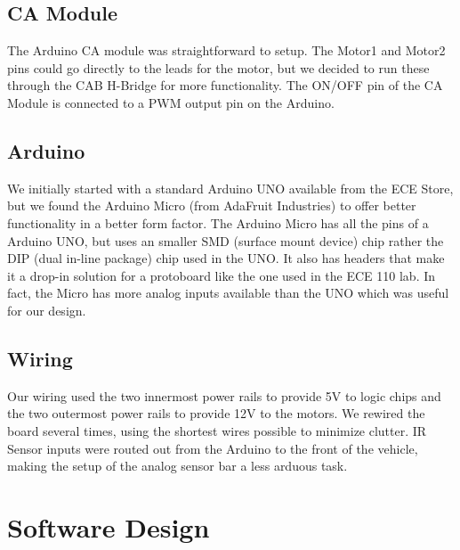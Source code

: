 \documentclass{article}
\begin{document}
\subsection{CA Module}
The Arduino CA module was straightforward to setup. The Motor1 and Motor2 pins could go directly to the leads for the motor, but we decided to run these through the CAB H-Bridge for more functionality. The ON/OFF pin of the CA Module is connected to a PWM output pin on the Arduino.
\subsection{Arduino}
We initially started with a standard Arduino UNO available from the ECE Store, but we found the Arduino Micro (from AdaFruit Industries) to offer better functionality in a better form factor. The Arduino Micro has all the pins of a Arduino UNO, but uses an smaller SMD (surface mount device) chip rather the DIP (dual in-line package) chip used in the UNO. It also has headers that make it a drop-in solution for a protoboard like the one used in the ECE 110 lab. In fact, the Micro has more analog inputs available than the UNO which was useful for our design.
\subsection{Wiring}
Our wiring used the two innermost power rails to provide 5V to logic chips and the two outermost power rails to provide 12V to the motors. We rewired the board several times, using the shortest wires possible to minimize clutter. IR Sensor inputs were routed out from the Arduino to the front of the vehicle, making the setup of the analog sensor bar a less arduous task.


\section{Software Design}
\end{document}
